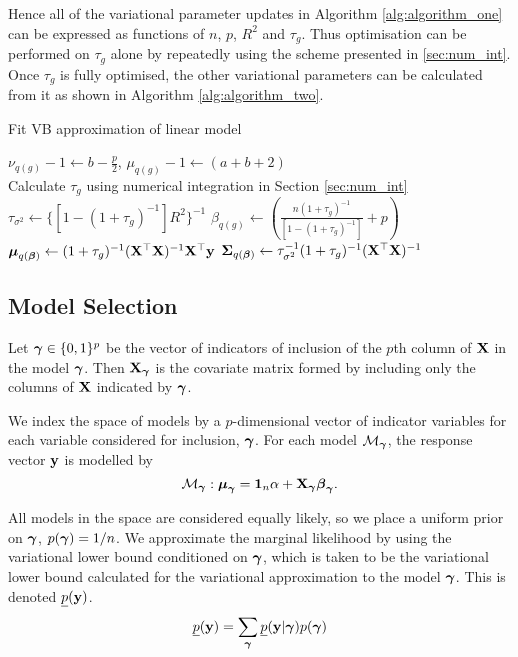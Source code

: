 \documentclass{amsart}[12pt]
\begin{document}
\noindent Hence all of the variational parameter updates in Algorithm \ref{alg:algorithm_one} can be expressed as functions
of $n$, $p$, $R^2$ and $\tau_g$. Thus optimisation can be performed on $\tau_g$ alone by repeatedly using the
scheme presented in \ref{sec:num_int}. Once $\tau_g$ is fully optimised, the other variational parameters can
be calculated from it as shown in Algorithm \ref{alg:algorithm_two}.

\begin{algorithm}
	\caption{Fit VB approximation of linear model}
	\label{alg:algorithm_two}
	\begin{algorithmic}
		\REQUIRE $\nu_{q(g)} - 1 \leftarrow b - \frac{p}{2}$, $\mu_{q(g)} - 1 \leftarrow (a + b + 2)$ \\
		\STATE Calculate $\tau_{g}$ using numerical integration in Section \ref{sec:num_int}
		\ENDWHILE
		\STATE $\tau_{\sigma^2} \leftarrow \{[1 - (1 + \tau_g)^{-1}] R^2\}^{-1}$
		\STATE $\beta_{q(g)} \leftarrow \left(\frac{n (1 + \tau_g)^{-1}}{[1 - (1 + \tau_g)^{-1}]} + p \right)$
		\STATE ${\boldsymbol \mu}_{q({\boldsymbol \beta})} \leftarrow (1 + \tau_g)^{-1} ({\bf X}^\top {\bf X})^{-1} {\bf X}^\top {\bf y}$
		\STATE ${\boldsymbol \Sigma}_{q({\boldsymbol \beta})} \leftarrow \tau_{\sigma^2}^{-1} (1 + \tau_{g})^{-1}({\bf X}^\top {\bf X})^{-1}$
	\end{algorithmic}
\end{algorithm}

\subsection{Model Selection}
\label{sec:model_selection}

Let ${\boldsymbol \gamma} \in \{0, 1\}^p$ be the vector of indicators of inclusion of the $p$th column of ${\bf X}$ in the
model ${\boldsymbol \gamma}$. Then ${\bf X}_{\boldsymbol \gamma}$ is the covariate matrix formed by including only the columns of ${\bf X}$
indicated by ${\boldsymbol \gamma}$.

We index the space of models by a $p$-dimensional vector of indicator variables for each variable considered 
for inclusion, ${\boldsymbol \gamma}$. For each model $\mathcal{M}_{\boldsymbol \gamma}$, the response vector ${\bf y}$ is modelled by
\begin{equation*}
	\mathcal{M}_{\boldsymbol \gamma}: {\boldsymbol \mu}_{\boldsymbol \gamma} = {\bf 1}_n \alpha + {\bf X}_{\boldsymbol \gamma} {\boldsymbol \beta}_{\boldsymbol \gamma}.
\end{equation*}


All models in the space are considered equally likely, so we place a uniform prior on ${\boldsymbol \gamma}$, $p({\boldsymbol \gamma}) =
1/n$. We approximate the marginal likelihood by using the variational lower bound conditioned on ${\boldsymbol \gamma}$,
which is taken to be the variational lower bound calculated for the variational approximation to the model
${\boldsymbol \gamma}$. This is denoted $\underline{p}({\bf y})$. 
$$\underline{p}({\bf y}) = \sum_{\boldsymbol \gamma} \underline{p}({\bf y}|{\boldsymbol \gamma}) p({\boldsymbol \gamma})$$
\end{document}

